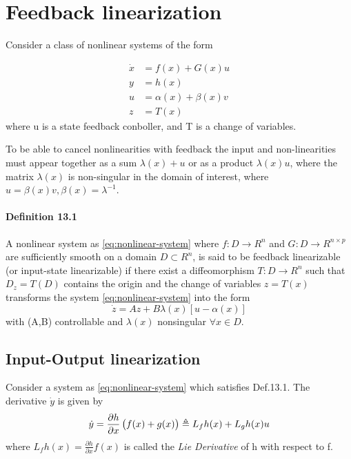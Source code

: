 \section{Feedback linearization}
Consider a class of nonlinear systems of the form

\begin{equation}
   \begin{split}
      \dot{x} &= f(x) + G(x)u \\
         y &=h(x) \\
         u &= \alpha (x) + \beta (x) v \\
         z &= T(x)
   \end{split}
   \label{eq:nonlinear-system}
\end{equation}
where u is a state feedback conboller, and T is a change of variables.

To be able to cancel nonlinearities with feedback the input and non-linearities must appear together as a sum $\lambda (x) + u$ or as a product $\lambda (x) u$, where the matrix $\lambda(x)$ is non-singular in the domain of interest, where $u=\beta(x)v, \beta(x)=\lambda^{-1}$.

\paragraph{Definition 13.1}
A nonlinear system as \ref{eq:nonlinear-system} where $f:D \rightarrow R^n$ and $G : D \rightarrow R^{n \times p}$ are sufficiently smooth on a domain $D \subset R^n$, is said to be feedback linearizable  (or input-state linearizable) if there exist a diffeomorphism $T:D \rightarrow R^n$ such that $D_z = T(D)$ contains the origin and the change of variables $z = T(x)$ transforms the system \ref{eq:nonlinear-system} into the form
\begin{equation}
\dot{z} = Az + B\lambda (x) [u - \alpha(x)]
\end{equation}
with (A,B) controllable and $\lambda(x)$ nonsingular $\forall x \in D$.

\subsection{Input-Output linearization}
Consider a system as \ref{eq:nonlinear-system} which satisfies Def.13.1. The derivative $\dot{y}$ is given by
\begin{equation}
	\dot{y} = \frac{\partial h}{\partial x}\del{f(x) + g(x)} \triangleq L_f h(x) + L_g h(x) u
\end{equation}
where $L_f h(x) = \frac{\partial h}{\partial x} f(x) $ is called the\emph{ Lie Derivative} of h with respect to f.
